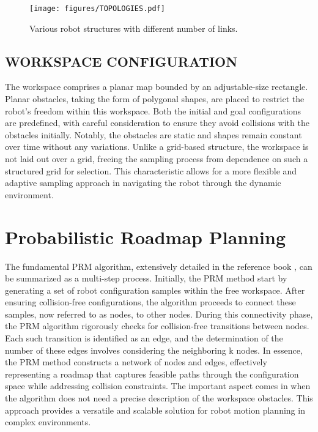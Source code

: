 \documentclass{IEEEtaes}
\begin{document}

\begin{figure}[b]
    \vspace{-2em}
    \begin{center}
        \texttt{[image: figures/TOPOLOGIES.pdf]}
     \end{center}
     \caption{Various robot structures with different number of links.}
     \label{topologies}
\end{figure}

\subsection{{\fontsize{11}{10}\selectfont W}ORKSPACE CONFIGURATION}

The workspace comprises a planar map bounded by an adjustable-size rectangle. Planar obstacles, taking the form of polygonal shapes, are placed to restrict the robot's freedom within this workspace. Both the initial and goal configurations are predefined, with careful consideration to ensure they avoid collisions with the obstacles initially. Notably, the obstacles are static and shapes remain constant over time without any variations. Unlike a grid-based structure, the workspace is not laid out over a grid, freeing the sampling process from dependence on such a structured grid for selection. This characteristic allows for a more flexible and adaptive sampling approach in navigating the robot through the dynamic environment.


\section{\large \textbf{Probabilistic Roadmap Planning}}
The fundamental PRM algorithm, extensively detailed in the reference book \cite{choset}, can be summarized as a multi-step process. Initially, the PRM method start by generating a set of robot configuration samples within the free workspace. After ensuring collision-free configurations, the algorithm proceeds to connect these samples, now referred to as nodes, to other nodes. During this connectivity phase, the PRM algorithm rigorously checks for collision-free transitions between nodes. Each such transition is identified as an edge, and the determination of the number of these edges involves considering the neighboring k nodes. In essence, the PRM method constructs a network of nodes and edges, effectively representing a roadmap that captures feasible paths through the configuration space while addressing collision constraints. The important aspect comes in when the algorithm does not need a precise description of the workspace obstacles. This approach provides a versatile and scalable solution for robot motion planning in complex environments.
\end{document}
